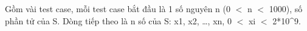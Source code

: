Gồm vài test case, mỗi test case bắt đầu là 1 số nguyên n (0 $<$  n $<$ 1000),  số phần tử của S. Dòng tiếp theo là n số của S: x1, x2, …, xn,  0 $<$ xi $<$ 2*10^9.  



\
